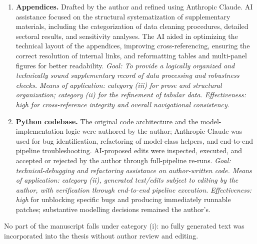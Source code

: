 \documentclass[a4paper, 12pt]{article}
\begin{document}
\begin{enumerate}
    \item \textbf{Appendices.} 
    Drafted by the author and refined using Anthropic Claude. AI assistance focused on the structural systematization of supplementary materials, including the categorization of data cleaning procedures, detailed sectoral results, and sensitivity analyses. The AI aided in optimizing the technical layout of the appendices, improving cross-referencing, ensuring the correct resolution of internal links, and reformatting tables and multi-panel figures for better readability. 
    \emph{Goal: To provide a logically organized and technically sound supplementary record of data processing and robustness checks. Means of application: category (iii) for prose and structural organization; category (ii) for the refinement of tabular data. Effectiveness: high for cross-reference integrity and overall navigational consistency.}

    \item \textbf{Python codebase.} The original code architecture and the model-implementation logic were authored by the author; Anthropic Claude was used for bug identification, refactoring of model-class helpers, and end-to-end pipeline troubleshooting. AI-proposed edits were inspected, executed, and accepted or rejected by the author through full-pipeline re-runs. \emph{Goal: technical-debugging and refactoring assistance on author-written code. Means of application: category (ii), generated text/edits subject to editing by the author, with verification through end-to-end pipeline execution.} \emph{Effectiveness: high} for unblocking specific bugs and producing immediately runnable patches; substantive modelling decisions remained the author's.
\end{enumerate}

No part of the manuscript falls under category (i): no fully generated text was incorporated into the thesis without author review and editing.
\end{document}
